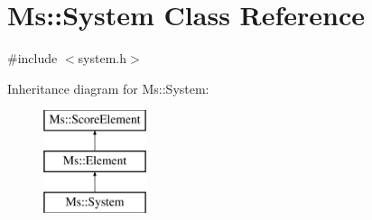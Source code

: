 \hypertarget{class_ms_1_1_system}{}\section{Ms\+:\+:System Class Reference}
\label{class_ms_1_1_system}


{\ttfamily \#include $<$system.\+h$>$}

Inheritance diagram for Ms\+:\+:System\+:\begin{figure}[H]
\begin{center}
\leavevmode
\includegraphics[height=3.000000cm]{class_ms_1_1_system}
\end{center}
\end{figure}

